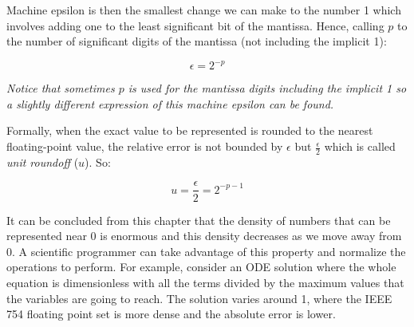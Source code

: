 Machine epsilon is then the smallest change we can make to the number 1 which involves adding one to the least significant bit of the mantissa. 
Hence, calling $p$ to the number of significant digits of the mantissa (not including the implicit 1):

$$
\epsilon = 2^{-p}
$$ 

\textit{Notice that sometimes $p$ is used for the mantissa digits including the implicit 1 so a slightly different expression of this machine epsilon can be found.}

Formally, when the exact value to be represented is rounded to the nearest floating-point value, the relative error is not bounded by $\epsilon$ but $\frac{\epsilon}{2}$ which is called \textit{unit roundoff} ($u$). So:

$$
u = \frac{\epsilon}{2} = 2^{-p-1}
$$






It can be concluded from this chapter that the density of numbers that can be represented near 0 is enormous and this density decreases as 
we move away from 0. A scientific programmer can take advantage of this property and normalize the operations to perform. 
For example, consider an ODE solution where the whole equation is dimensionless with all the terms divided by the 
maximum values that the variables are going to reach. The solution varies around 1, where the IEEE 754 floating point 
set is more dense and the absolute error is lower. 








